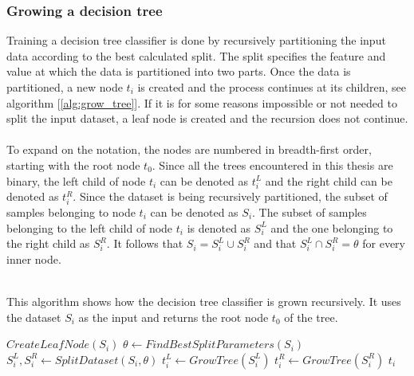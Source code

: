 \documentclass[11pt]{article}
\begin{document}
      \subsubsection{Growing a decision tree}
        Training a decision tree classifier is done by recursively partitioning the input data according to the best calculated split. The split specifies the feature and value at which the data is partitioned into two parts. Once the data is partitioned, a new node $t_i$ is created and the process continues at its children, see algorithm [\ref{alg:grow_tree}]. If it is for some reasons impossible or not needed to split the input dataset, a leaf node is created and the recursion does not continue. \cite{brabec}
        \\~\\
        To expand on the notation, the nodes are numbered in breadth-first order, starting with the root node $t_0$. Since all the trees encountered in this thesis are binary, the left child of node $t_i$ can be denoted as $t_i^L$ and the right child can be denoted as $t_i^R$. Since the dataset is being recursively partitioned, the subset of samples belonging to node $t_i$ can be denoted as $S_i$. The subset of samples belonging to the left child of node $t_i$ is denoted as $S_i^L$ and the one belonging to the right child as $S_i^R$. It follows that $S_i = S_i^L \cup S_i^R$ and that $S_i^L \cap S_i^R = \theta$ for every inner node. \cite{brabec}
        \\~\\
        \begin{algorithm}
          \caption{This algorithm shows how the decision tree classifier is grown recursively. It uses the dataset $S_i$ as the input and returns the root node $t_0$ of the tree. \cite{brabec}}
          \label{alg:grow_tree}
          \begin{algorithmic}[1] %
                \State \Return $CreateLeafNode(S_i)$
              \EndIf
              \State $\theta \gets FindBestSplitParameters(S_i)$
              \State $S_i^L, S_i^R \gets SplitDataset(S_i, \theta)$
              \State $t_i^L \gets GrowTree(S_i^L)$
              \State $t_i^R \gets GrowTree(S_i^R)$
              \State \Return $t_i$
            \EndFunction
          \end{algorithmic}
        \end{algorithm}
\end{document}
